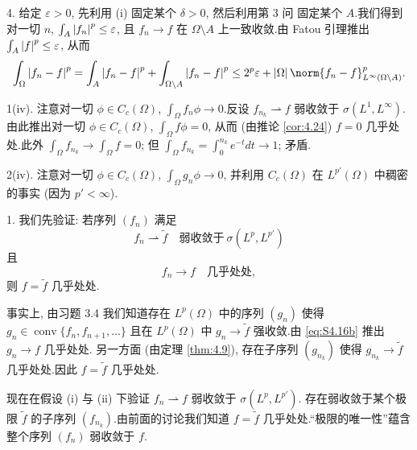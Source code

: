 4. 给定 $\varepsilon>0$, 先利用 (i) 固定某个 $\delta>0$, 然后利用第 3 问
固定某个 $A$.我们得到对一切 $n$, $\int_A\left|f_n\right|^p\le\varepsilon$, 且
$f_n\to f$ 在 $\Omega\setminus A$ 上一致收敛.由 Fatou 引理推出
$\int_A\left|f\right|^p\le\varepsilon$, 从而
\begin{equation*}
\int_\Omega\abs{f_n-f}^p=\int_A\abs{f_n-f}^p+\int_{\Omega\setminus A}\abs{f_n-f}^p
\le2^p\varepsilon+\abs{\Omega}\norm{f_n-f}_{L^\infty(\Omega\setminus A)}^p.
\end{equation*}


1(iv). 注意对一切 $\phi\in C_c(\Omega)$, $\int_\Omega f_n\phi\to0$.反设
$f_{n_k}\rightharpoonup f$ 弱收敛于 $\sigma(L^1,L^\infty)$.由此推出对一切
$\phi\in C_c(\Omega)$, $\int_\Omega f\phi=0$, 从而 (由推论  \ref{cor:4.24})
$f=0$ 几乎处处.此外 $\int_\Omega f_{n_k}\to\int_\Omega f=0$; 但
$\int_\Omega f_{n_k}=\int_0^{n_k}e^{-t}dt\to1$; 矛盾.

2(iv). 注意对一切 $\phi\in C_c(\Omega)$, $\int_\Omega g_n\phi\to0$, 并利用
$C_c(\Omega)$ 在 $L^{p'}(\Omega)$ 中稠密的事实 (因为 $p'<\infty$).


1. 我们先验证: 若序列 $(f_n)$ 满足
\begin{equation}
f_n\rightharpoonup\tilde f\quad\text{弱收敛于}\ \sigma(L^p,L^{p'})
\tag{S1}
\label{eq:S4.16a}
\end{equation}
且
\begin{equation}
f_n\to f\quad\text{几乎处处},
\tag{S2}
\label{eq:S4.16b}
\end{equation}
则 $f=\tilde f$ 几乎处处.

事实上, 由习题 3.4 我们知道存在 $L^p(\Omega)$ 中的序列 $(g_n)$ 使得
$g_n\in\operatorname{conv}\{f_n,f_{n+1},\dots\}$ 且在 $L^p(\Omega)$ 中
$g_n\to\tilde f$ 强收敛.由 \eqref{eq:S4.16b} 推出 $g_n\to f$ 几乎处处.
另一方面 (由定理  \ref{thm:4.9}), 存在子序列 $(g_{n_k})$ 使得
$g_{n_k}\to\tilde f$ 几乎处处.因此 $f=\tilde f$ 几乎处处.

现在在假设 (i) 与 (ii) 下验证 $f_n\rightharpoonup f$ 弱收敛于 $\sigma(L^p,L^{p'})$.
存在弱收敛于某个极限 $\tilde f$ 的子序列 $(f_{n_k})$.由前面的讨论我们知道
$f=\tilde f$ 几乎处处.``极限的唯一性''蕴含整个序列 $(f_n)$ 弱收敛于 $f$.

